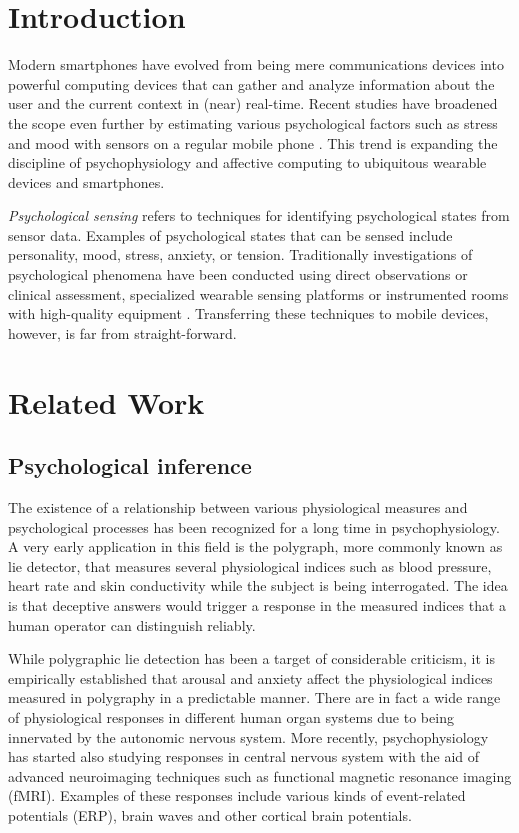 \section{Introduction}

Modern smartphones have evolved from being mere communications devices into
powerful computing devices that can gather and analyze information about the
user and the current context in (near) real-time. Recent studies have broadened
the scope even further by estimating various psychological factors such
as stress and mood with sensors on a regular mobile phone
\cite{lu12stresssense} \cite{likamwa13moodscope}. This trend is expanding
the discipline of psychophysiology and affective computing
\cite{picard95affective}
to ubiquitous
wearable devices and smartphones.

\textit{Psychological sensing} refers to techniques for identifying
psychological states from sensor data. Examples of psychological states that
can be sensed include personality, mood, stress, anxiety, or tension.
Traditionally investigations of psychological phenomena have been conducted
using direct observations or clinical assessment, specialized wearable sensing
platforms \cite{choudhury03sensing} \cite{olguin09capturing} or instrumented
rooms with high-quality equipment \cite{pianesi08multimodal}. Transferring
these techniques to mobile devices, however, is far from straight-forward.

\section{Related Work}

\subsection{Psychological inference}

The existence of a relationship between various physiological measures and
psychological processes has been recognized for a long time in
psychophysiology. A very early application in this field is the polygraph,
more commonly known as lie detector, that measures several physiological indices
such as blood pressure, heart rate and skin conductivity while the
subject is being interrogated. The idea is that deceptive answers
would trigger a response in the measured indices that a human operator can
distinguish reliably.

While polygraphic lie detection has been a target of considerable criticism,
it is empirically established that arousal and anxiety affect the
physiological indices measured in polygraphy in a predictable manner.
There are in fact a wide range of physiological responses in different
human organ systems due to being innervated by the autonomic nervous system.
More recently, psychophysiology has started also studying responses in
central nervous system with the aid of advanced neuroimaging techniques such
as functional magnetic resonance imaging (fMRI). Examples of these responses
include various kinds of event-related potentials (ERP), brain waves and other
cortical brain potentials.

